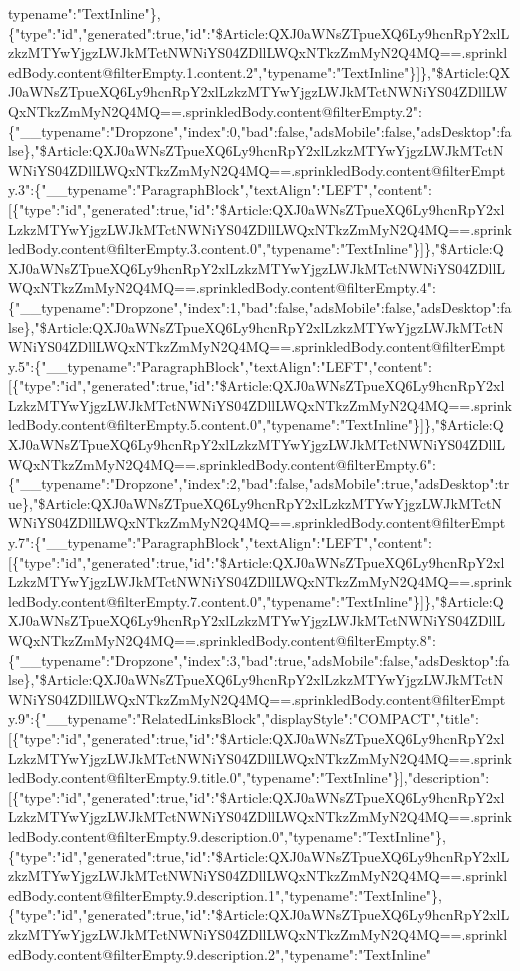 typename":"TextInline"\},\{"type":"id","generated":true,"id":"\$Article:QXJ0aWNsZTpueXQ6Ly9hcnRpY2xlLzkzMTYwYjgzLWJkMTctNWNiYS04ZDllLWQxNTkzZmMyN2Q4MQ==.sprinkledBody.content@filterEmpty.1.content.2","typename":"TextInline"\}{]}\},"\$Article:QXJ0aWNsZTpueXQ6Ly9hcnRpY2xlLzkzMTYwYjgzLWJkMTctNWNiYS04ZDllLWQxNTkzZmMyN2Q4MQ==.sprinkledBody.content@filterEmpty.2":\{"\_\_typename":"Dropzone","index":0,"bad":false,"adsMobile":false,"adsDesktop":false\},"\$Article:QXJ0aWNsZTpueXQ6Ly9hcnRpY2xlLzkzMTYwYjgzLWJkMTctNWNiYS04ZDllLWQxNTkzZmMyN2Q4MQ==.sprinkledBody.content@filterEmpty.3":\{"\_\_typename":"ParagraphBlock","textAlign":"LEFT","content":{[}\{"type":"id","generated":true,"id":"\$Article:QXJ0aWNsZTpueXQ6Ly9hcnRpY2xlLzkzMTYwYjgzLWJkMTctNWNiYS04ZDllLWQxNTkzZmMyN2Q4MQ==.sprinkledBody.content@filterEmpty.3.content.0","typename":"TextInline"\}{]}\},"\$Article:QXJ0aWNsZTpueXQ6Ly9hcnRpY2xlLzkzMTYwYjgzLWJkMTctNWNiYS04ZDllLWQxNTkzZmMyN2Q4MQ==.sprinkledBody.content@filterEmpty.4":\{"\_\_typename":"Dropzone","index":1,"bad":false,"adsMobile":false,"adsDesktop":false\},"\$Article:QXJ0aWNsZTpueXQ6Ly9hcnRpY2xlLzkzMTYwYjgzLWJkMTctNWNiYS04ZDllLWQxNTkzZmMyN2Q4MQ==.sprinkledBody.content@filterEmpty.5":\{"\_\_typename":"ParagraphBlock","textAlign":"LEFT","content":{[}\{"type":"id","generated":true,"id":"\$Article:QXJ0aWNsZTpueXQ6Ly9hcnRpY2xlLzkzMTYwYjgzLWJkMTctNWNiYS04ZDllLWQxNTkzZmMyN2Q4MQ==.sprinkledBody.content@filterEmpty.5.content.0","typename":"TextInline"\}{]}\},"\$Article:QXJ0aWNsZTpueXQ6Ly9hcnRpY2xlLzkzMTYwYjgzLWJkMTctNWNiYS04ZDllLWQxNTkzZmMyN2Q4MQ==.sprinkledBody.content@filterEmpty.6":\{"\_\_typename":"Dropzone","index":2,"bad":false,"adsMobile":true,"adsDesktop":true\},"\$Article:QXJ0aWNsZTpueXQ6Ly9hcnRpY2xlLzkzMTYwYjgzLWJkMTctNWNiYS04ZDllLWQxNTkzZmMyN2Q4MQ==.sprinkledBody.content@filterEmpty.7":\{"\_\_typename":"ParagraphBlock","textAlign":"LEFT","content":{[}\{"type":"id","generated":true,"id":"\$Article:QXJ0aWNsZTpueXQ6Ly9hcnRpY2xlLzkzMTYwYjgzLWJkMTctNWNiYS04ZDllLWQxNTkzZmMyN2Q4MQ==.sprinkledBody.content@filterEmpty.7.content.0","typename":"TextInline"\}{]}\},"\$Article:QXJ0aWNsZTpueXQ6Ly9hcnRpY2xlLzkzMTYwYjgzLWJkMTctNWNiYS04ZDllLWQxNTkzZmMyN2Q4MQ==.sprinkledBody.content@filterEmpty.8":\{"\_\_typename":"Dropzone","index":3,"bad":true,"adsMobile":false,"adsDesktop":false\},"\$Article:QXJ0aWNsZTpueXQ6Ly9hcnRpY2xlLzkzMTYwYjgzLWJkMTctNWNiYS04ZDllLWQxNTkzZmMyN2Q4MQ==.sprinkledBody.content@filterEmpty.9":\{"\_\_typename":"RelatedLinksBlock","displayStyle":"COMPACT","title":{[}\{"type":"id","generated":true,"id":"\$Article:QXJ0aWNsZTpueXQ6Ly9hcnRpY2xlLzkzMTYwYjgzLWJkMTctNWNiYS04ZDllLWQxNTkzZmMyN2Q4MQ==.sprinkledBody.content@filterEmpty.9.title.0","typename":"TextInline"\}{]},"description":{[}\{"type":"id","generated":true,"id":"\$Article:QXJ0aWNsZTpueXQ6Ly9hcnRpY2xlLzkzMTYwYjgzLWJkMTctNWNiYS04ZDllLWQxNTkzZmMyN2Q4MQ==.sprinkledBody.content@filterEmpty.9.description.0","typename":"TextInline"\},\{"type":"id","generated":true,"id":"\$Article:QXJ0aWNsZTpueXQ6Ly9hcnRpY2xlLzkzMTYwYjgzLWJkMTctNWNiYS04ZDllLWQxNTkzZmMyN2Q4MQ==.sprinkledBody.content@filterEmpty.9.description.1","typename":"TextInline"\},\{"type":"id","generated":true,"id":"\$Article:QXJ0aWNsZTpueXQ6Ly9hcnRpY2xlLzkzMTYwYjgzLWJkMTctNWNiYS04ZDllLWQxNTkzZmMyN2Q4MQ==.sprinkledBody.content@filterEmpty.9.description.2","typename":"TextInline"